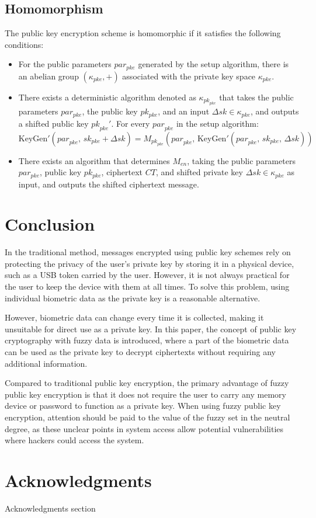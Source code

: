 \documentclass[graybox]{svmult}
\begin{document}
\subsection{Homomorphism}

The public key encryption scheme is homomorphic if it satisfies the following conditions:
\begin{itemize}
    \item For the public parameters \( par_{pke} \) generated by the setup algorithm, there is an abelian group \( (\kappa_{pke}, +) \) associated with the private key space \( \kappa_{pke} \).
    \item There exists a deterministic algorithm denoted as \( \kappa_{{pk}_{pke}} \) that takes the public parameters \( par_{pke} \), the public key \( pk_{pke} \), and an input \(\Delta{sk} \in \kappa_{pke} \), and outputs a shifted public key \({pk}_{pke}'\). For every \( {par}_{pke} \) in the setup algorithm:
          \[
              \text{KeyGen}'( {par}_{pke}, \, {sk}_{pke} + \Delta{sk}) = M_{{pk}_{pke}} ({par}_{pke}, \, \text{KeyGen}'({par}_{pke}, \, {sk}_{pke}, \, \Delta{sk}))
          \]

    \item There exists an algorithm that determines \( M_{en} \), taking the public parameters \( par_{pke} \), public key \( pk_{pke} \), ciphertext \( CT \), and shifted private key \( \Delta sk \in \kappa_{pke} \) as input, and outputs the shifted ciphertext message.
\end{itemize}

\section{Conclusion}
In the traditional method, messages encrypted using public key schemes rely on protecting the privacy of the user's private key by storing it in a physical device, such as a USB token carried by the user. However, it is not always practical for the user to keep the device with them at all times. To solve this problem, using individual biometric data as the private key is a reasonable alternative.

However, biometric data can change every time it is collected, making it \allowbreak unsuitable for direct use as a private key. In this paper, the concept of public key cryptography with fuzzy data is introduced, where a part of the biometric data can be used as the private key to decrypt ciphertexts without requiring any additional information.

Compared to traditional public key encryption, the primary advantage of fuzzy public key encryption is that it does not require the user to carry any memory device or password to function as a private key. When using fuzzy public key encryption, attention should be paid to the value of the fuzzy set in the neutral degree, as these unclear points in system access allow potential vulnerabilities where hackers could access the system.

\section*{Acknowledgments}
Acknowledgments section


\printbibliography
\end{document}
